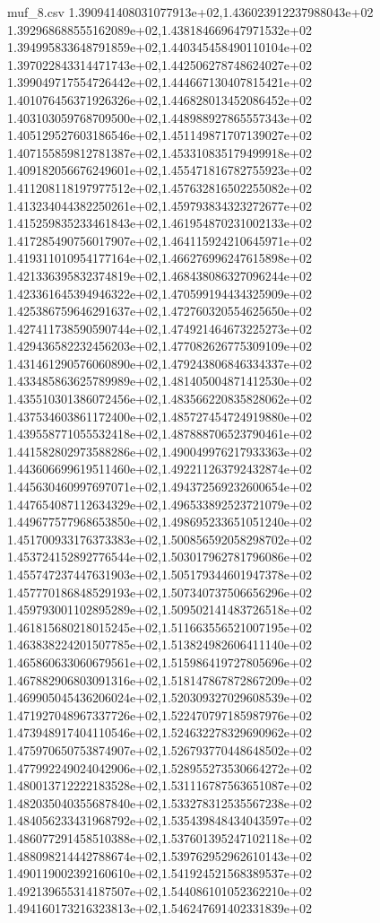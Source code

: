 \begin{filecontents*}{muf_8.csv}
1.390941408031077913e+02,1.436023912237988043e+02
1.392968688555162089e+02,1.438184669647971532e+02
1.394995833648791859e+02,1.440345458490110104e+02
1.397022843314471743e+02,1.442506278748624027e+02
1.399049717554726442e+02,1.444667130407815421e+02
1.401076456371926326e+02,1.446828013452086452e+02
1.403103059768709500e+02,1.448988927865557343e+02
1.405129527603186546e+02,1.451149871707139027e+02
1.407155859812781387e+02,1.453310835179499918e+02
1.409182056676249601e+02,1.455471816782755923e+02
1.411208118197977512e+02,1.457632816502255082e+02
1.413234044382250261e+02,1.459793834323272677e+02
1.415259835233461843e+02,1.461954870231002133e+02
1.417285490756017907e+02,1.464115924210645971e+02
1.419311010954177164e+02,1.466276996247615898e+02
1.421336395832374819e+02,1.468438086327096244e+02
1.423361645394946322e+02,1.470599194434325909e+02
1.425386759646291637e+02,1.472760320554625650e+02
1.427411738590590744e+02,1.474921464673225273e+02
1.429436582232456203e+02,1.477082626775309109e+02
1.431461290576060890e+02,1.479243806846334337e+02
1.433485863625789989e+02,1.481405004871412530e+02
1.435510301386072456e+02,1.483566220835828062e+02
1.437534603861172400e+02,1.485727454724919880e+02
1.439558771055532418e+02,1.487888706523790461e+02
1.441582802973588286e+02,1.490049976217933363e+02
1.443606699619511460e+02,1.492211263792432874e+02
1.445630460997697071e+02,1.494372569232600654e+02
1.447654087112634329e+02,1.496533892523721079e+02
1.449677577968653850e+02,1.498695233651051240e+02
1.451700933176373383e+02,1.500856592058298702e+02
1.453724152892776544e+02,1.503017962781796086e+02
1.455747237447631903e+02,1.505179344601947378e+02
1.457770186848529193e+02,1.507340737506656296e+02
1.459793001102895289e+02,1.509502141483726518e+02
1.461815680218015245e+02,1.511663556521007195e+02
1.463838224201507785e+02,1.513824982606411140e+02
1.465860633060679561e+02,1.515986419727805696e+02
1.467882906803091316e+02,1.518147867872867209e+02
1.469905045436206024e+02,1.520309327029608539e+02
1.471927048967337726e+02,1.522470797185987976e+02
1.473948917404110546e+02,1.524632278329690962e+02
1.475970650753874907e+02,1.526793770448648502e+02
1.477992249024042906e+02,1.528955273530664272e+02
1.480013712222183528e+02,1.531116787563651087e+02
1.482035040355687840e+02,1.533278312535567238e+02
1.484056233431968792e+02,1.535439848434043597e+02
1.486077291458510388e+02,1.537601395247102118e+02
1.488098214442788674e+02,1.539762952962610143e+02
1.490119002392160610e+02,1.541924521568389537e+02
1.492139655314187507e+02,1.544086101052362210e+02
1.494160173216323813e+02,1.546247691402331839e+02

\end{filecontents*}
